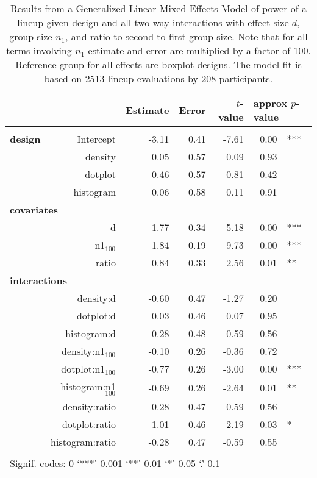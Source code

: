\begin{table}[ht]
\begin{center}
\resizebox{\linewidth}{!} {
\begin{tabular}{lrrrrrl}
  \hline
& & Estimate & Error & $t$-value & \multicolumn{2}{l}{approx $p$-value} \\   \hline
\\[-8pt]
\bf design& Intercept & -3.11 & 0.41 & -7.61 & 0.00 & ***\\ 
&  density & 0.05 & 0.57 & 0.09 & 0.93 \\ 
&  dotplot & 0.46 & 0.57 & 0.81 & 0.42\\ 
&  histogram & 0.06 & 0.58 & 0.11 & 0.91 \\ [2pt]
\multicolumn{2}{l}{\bf covariates}\\
&  d & 1.77 & 0.34 & 5.18 & 0.00 & ***\\ 
&  n1$_{100}$ & 1.84 & 0.19 & 9.73 & 0.00 & ***\\ 
&  ratio & 0.84 & 0.33 & 2.56 & 0.01 & **\\ 
\multicolumn{2}{l}{\bf interactions}\\
&  density:d & -0.60 & 0.47 & -1.27 & 0.20 \\ 
&  dotplot:d & 0.03 & 0.46 & 0.07 & 0.95  \\ 
&  histogram:d & -0.28 & 0.48 & -0.59 & 0.56 \\ [1pt]
&  density:n1$_{100}$ & -0.10 & 0.26 & -0.36 & 0.72\\ 
&  dotplot:n1$_{100}$ & -0.77 & 0.26 & -3.00 & 0.00 & ***\\ 
&  histogram:n1$_{100}$ & -0.69 & 0.26 & -2.64 & 0.01 & ** \\ [1pt]
&  density:ratio & -0.28 & 0.47 & -0.59 & 0.56 \\ 
&  dotplot:ratio & -1.01 & 0.46 & -2.19 & 0.03 & * \\ 
&  histogram:ratio & -0.28 & 0.47 & -0.59 & 0.55 \\ 
   \hline
\\[-5pt]
   \multicolumn{5}{l}{Signif. codes:  0 `***' 0.001 `**' 0.01 `*' 0.05 `.' 0.1}
\end{tabular}}
\end{center}
\vspace{-0.2in}
\caption{\label{tbl:power2}Results from a Generalized Linear Mixed Effects Model of power of a  lineup given design and all two-way interactions with effect size $d$, group size $n_1$, and ratio to second to first group size. 
Note that for all terms involving $n_1$ estimate and error are multiplied by a factor of 100. 
Reference group for all effects are boxplot designs. The model fit is based on 2513 lineup evaluations by 208 participants. }
\end{table}

